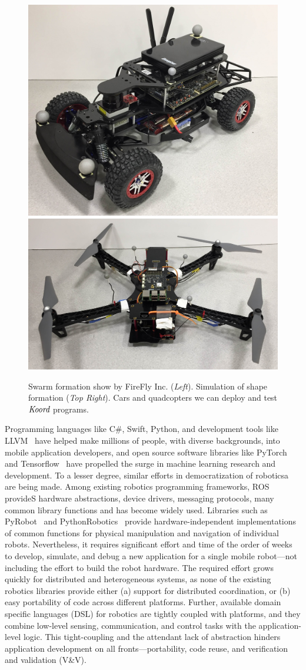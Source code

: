 \begin{figure}[htb!]
\begin{minipage}{0.55\columnwidth}
	\includegraphics[width=0.42\linewidth]{figs/car.jpg}
	\includegraphics[width=0.56\linewidth]{figs/quad.jpg}
\end{minipage}%
	\caption{\small
        Swarm formation show by FireFly Inc. (\emph{Left}).
        Simulation of shape formation (\emph{Top Right}).
        Cars and quadcopters we can deploy and test $\emph{Koord}$ programs.\vspace{-5mm}}
    \label{fig:firefly}
\end{figure}
Programming languages like C\#, Swift, Python, and development tools like LLVM~\cite{llvm} have helped make millions of people, with diverse backgrounds, into mobile application developers, and open source software libraries like PyTorch~\cite{NEURIPS2019_9015} and Tensorflow~\cite{tensorflow2015-whitepaper} have propelled the surge in machine learning research and development. To a lesser degree, similar efforts in democratization of roboticsa are being made. Among existing robotics programming frameworks, ROS~\cite{ros} provideS hardware abstractions, device drivers, messaging protocols, many common library functions and has become widely used. Libraries such as PyRobot~\cite{pyrobot2019} and PythonRobotics~\cite{sakai2018pythonrobotics} provide hardware-independent implementations of common functions for physical manipulation and navigation of individual robots. Nevertheless, it requires significant effort and time of the order of weeks to develop, simulate, and debug a new application for a single mobile robot---not including the effort to build the robot hardware. The required effort grows quickly for distributed and heterogeneous systems, as none of the existing robotics libraries provide either (a) support for distributed  coordination, or (b) easy portability of code across different platforms. Further, available domain specific languages (DSL) for robotics are tightly coupled with platforms, and they combine low-level sensing, communication, and control tasks with the application-level logic. This tight-coupling and the attendant lack of abstraction hinders application development on all fronts---portability, code reuse, and verification and validation (V\&V).

